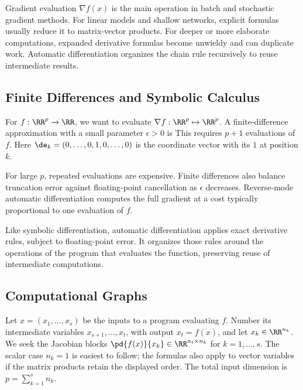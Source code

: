                                        

                                    



Gradient evaluation $\nabla f(x)$ is the main operation in batch and stochastic gradient methods. For linear models and shallow networks, explicit formulas usually reduce it to matrix-vector products. For deeper or more elaborate computations, expanded derivative formulas become unwieldy and can duplicate work. Automatic differentiation organizes the chain rule recursively to reuse intermediate results.

                                                                        
\subsection{Finite Differences and Symbolic Calculus}

For $f : \RR^p \rightarrow \RR$, we want to evaluate $\nabla f : \RR^p \mapsto \RR^p$. A finite-difference approximation with a small parameter $\epsilon>0$ is
This requires $p+1$ evaluations of $f$. Here $\de_k=(0,\ldots,0,1,0,\ldots,0)$ is the coordinate vector with its $1$ at position $k$.
 
For large $p$, repeated evaluations are expensive. Finite differences also balance truncation error against floating-point cancellation as $\epsilon$ decreases. Reverse-mode automatic differentiation computes the full gradient at a cost typically proportional to one evaluation of $f$.
 
Like symbolic differentiation, automatic differentiation applies exact derivative rules, subject to floating-point error. It organizes those rules around the operations of the program that evaluates the function, preserving reuse of intermediate computations.


                                                                        
\subsection{Computational Graphs}

Let $x=(x_1,\ldots,x_s)$ be the inputs to a program evaluating $f$. Number its intermediate variables $x_{s+1},\ldots,x_t$, with output $x_t=f(x)$, and let $x_k\in\RR^{n_k}$. We seek the Jacobian blocks $\pd{f(x)}{x_k}\in\RR^{n_t\times n_k}$ for $k=1,\ldots,s$. The scalar case $n_k=1$ is easiest to follow; the formulas also apply to vector variables if the matrix products retain the displayed order. The total input dimension is $p=\sum_{k=1}^s n_k$.

